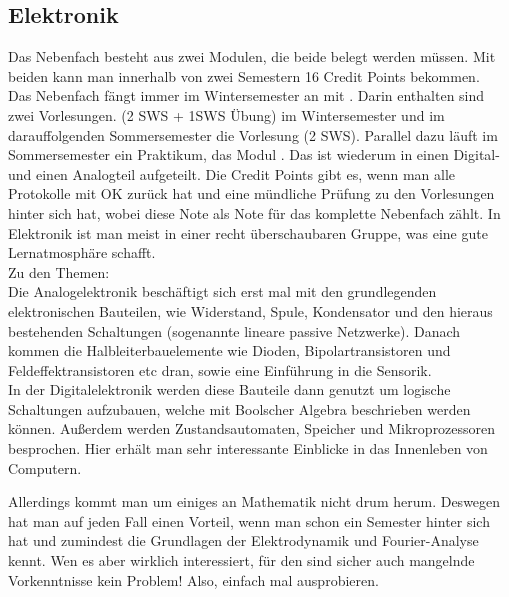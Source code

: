 \subsection{Elektronik}

Das Nebenfach  besteht aus zwei Modulen, die beide belegt werden müssen.
Mit beiden kann man innerhalb von zwei Semestern 16 Credit Points bekommen. \\
Das Nebenfach fängt immer im Wintersemester an mit .
Darin enthalten sind zwei Vorlesungen.
 (2 SWS + 1SWS Übung) im Wintersemester
und im darauffolgenden Sommersemester die Vorlesung  (2 SWS).
Parallel dazu läuft im Sommersemester ein Praktikum, das Modul .
Das ist wiederum in einen Digital- und einen Analogteil aufgeteilt.
Die Credit Points gibt es, wenn man alle Protokolle mit OK zurück hat und eine mündliche Prüfung zu den Vorlesungen hinter sich hat, wobei diese Note als Note für das komplette Nebenfach zählt.
In Elektronik ist man meist in einer recht überschaubaren Gruppe, was eine gute Lernatmosphäre schafft.\\
Zu den Themen: \\
Die Analogelektronik beschäftigt sich erst mal mit den grundlegenden elektronischen Bauteilen, wie Widerstand, Spule, Kondensator und den hieraus bestehenden Schaltungen (sogenannte lineare passive Netzwerke).
Danach kommen die Halbleiterbauelemente wie Dioden, Bipolartransistoren und Feldeffektransistoren etc dran, sowie eine Einführung in die Sensorik.\\
In der Digitalelektronik werden diese Bauteile dann genutzt um logische Schaltungen aufzubauen, welche mit Boolscher Algebra beschrieben werden können.
Außerdem werden Zustandsautomaten, Speicher und Mikroprozessoren besprochen.
Hier erhält man sehr interessante Einblicke in das Innenleben von Computern.

Allerdings kommt man um einiges an Mathematik nicht drum herum.
Deswegen hat man auf jeden Fall einen Vorteil, wenn man schon ein Semester hinter sich hat und zumindest die Grundlagen der Elektrodynamik und Fourier-Analyse kennt.
Wen es aber wirklich interessiert, für den sind sicher auch mangelnde Vorkenntnisse kein Problem!
Also, einfach mal ausprobieren.


